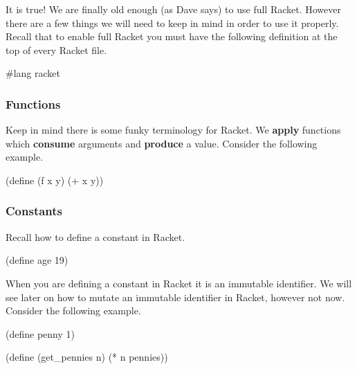 

It is true! We are finally old enough (as Dave says) to use full Racket. However there are a few things we will need to keep in mind in order to use it properly. Recall that to enable full Racket you must have the following definition at the top of every Racket file.\\

\begin{code}[Lisp]
#lang racket
\end{code}

\subsubsection*{Functions}

Keep in mind there is some funky terminology for Racket. We \textbf{apply} functions which \textbf{consume} arguments and \textbf{produce} a value. Consider the following example.\\


\begin{code}[Lisp]
(define (f x y)
	(+ x y))
\end{code}

\subsubsection*{Constants}

Recall how to define a constant in Racket.\\

\begin{code}[Lisp]
(define age 19)
\end{code}

When you are defining a constant in Racket it is an immutable identifier. We will see later on how to mutate an immutable identifier in Racket, however not now. Consider the following example.\\


\begin{code}[Lisp]
(define penny 1)

(define (get_pennies n)
	(* n pennies))
\end{code}

